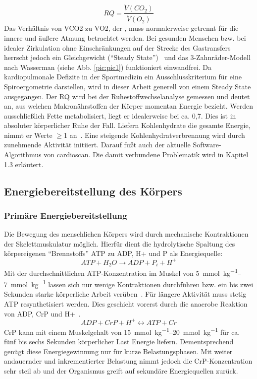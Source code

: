 %
\begin{equation}
RQ = \frac{\dot{V}(CO_2)}{\dot{V}(O_2)}
\label{eq:formel1}
\end{equation}
%
Das Verhältnis von \gls{VCO2} zu \gls{VO2}, der , muss normalerweise getrennt für die innere und äußere Atmung betrachtet werden. Bei gesunden Menschen bzw. bei idealer Zirkulation ohne Einschränkungen auf der Strecke des Gastransfers herrscht jedoch ein Gleichgewicht ("`Steady State"')~\cite{Kroidl.2015} und das 3-Zahnräder-Modell nach Wasserman (siehe Abb. \ref{pic:pic1}) funktioniert einwandfrei. Da kardiopulmonale Defizite in der Sportmedizin ein Ausschlusskriterium für eine Spiroergometrie darstellen, wird in dieser Arbeit generell von einem Steady State ausgegangen. Der RQ wird bei der Ruhestoffwechselanalyse gemessen und deutet an, aus welchen Makronährstoffen der Körper momentan Energie bezieht. Werden ausschließlich Fette metabolisiert, liegt er idealerweise bei ca. 0,7. Dies ist in absoluter körperlicher Ruhe der Fall. Liefern Kohlenhydrate die gesamte Energie, nimmt er Werte $\geq$1 an~\cite{Kroidl.2015}. Eine steigende Kohlenhydratverbrennung wird durch zunehmende Aktivität initiiert. Darauf fußt auch der aktuelle Software-Algorithmus von cardioscan. Die damit verbundene Problematik wird in Kapitel 1.3 erläutert.
%
\subsection{Energiebereitstellung des Körpers}
%
\subsubsection{Primäre Energiebereitstellung}
%
Die Bewegung des menschlichen Körpers wird durch mechanische Kontraktionen der Skelettmuskulatur möglich. Hierfür dient die hydrolytische Spaltung des körpereigenen "`Brennstoffs"' \gls{ATP} zu \gls{ADP}, \gls{H+} und \gls{P} als Energiequelle:
%
\begin{equation}
ATP + H_2O \rightarrow ADP + P_i + H^+
\label{eq:formel2}
\end{equation}
%
Mit der durchschnittlichen \gls{ATP}-Konzentration im Muskel von \SIrange{5}{7}{\milli\mole\per\kg} lassen sich nur wenige Kontraktionen durchführen bzw. ein bis zwei Sekunden starke körperliche Arbeit verüben~\cite{DeMarees.1981}. Für längere Aktivität muss stetig \gls{ATP} resynthetisiert werden. Dies geschieht vorerst durch die anaerobe Reaktion von \gls{ADP}, \gls{CrP} und \gls{H+}~\cite{Heck.2006}.
%
\begin{equation}
ADP + CrP + H^+ \leftrightarrow ATP + Cr
\label{eq:formel3}
\end{equation}
%
\gls{CrP} kann mit einem Muskelgehalt von \SIrange{15}{20}{\milli\mole\per\kg} für ca. fünf bis sechs Sekunden körperlicher Last Energie liefern. Dementsprechend genügt diese Energiegewinnung nur für kurze Belastungsphasen. Mit weiter andauernder und inkrementierter Belastung nimmt jedoch die \gls{CrP}-Konzentration sehr steil ab und der Organismus greift auf sekundäre Energiequellen zurück.
\clearpage
